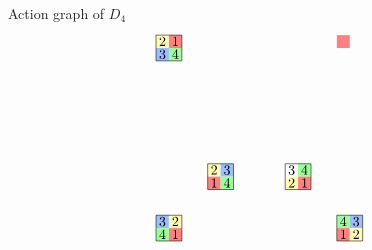 \documentclass[8pt, handout]{beamer}
\begin{document}
\begin{frame}{Action graph of $D_4$}
\[\begin{tikzpicture}
\begin{scope}[scale=.65]
\begin{scope}[shift={(3,-3)}]
        \path[fill=actGreen] (.5,.5) rectangle ++(.5,.5);
        \path[fill=actYellow] (0,0) rectangle ++(.5,.5);
        \path[fill=actRed] (.5,0) rectangle ++(.5,.5);
        \draw (0,0) rectangle (1,1);
        \draw (.25,.75) node{$3$}; \draw (.75,.75) node{$4$};
        \draw (.25,.25) node{$2$}; \draw (.75,.25) node{$1$};
      \end{scope}
      \begin{scope}[shift={(0,-3)}]
        \path[fill=actYellow] (0,.5) rectangle ++(.5,.5); 
        \path[fill=actBlue] (.5,.5) rectangle ++(.5,.5);
        \path[fill=actRed] (0,0) rectangle ++(.5,.5);
        \path[fill=actGreen] (.5,0) rectangle ++(.5,.5);
        \draw (0,0) rectangle (1,1);
        \draw (.25,.75) node{$2$}; \draw (.75,.75) node{$3$};
        \draw (.25,.25) node{$1$}; \draw (.75,.25) node{$4$};
      \end{scope}
      \begin{scope}[shift={(-2,2)}]
        \path[fill=actYellow] (0,.5) rectangle ++(.5,.5); 
        \path[fill=actRed] (.5,.5) rectangle ++(.5,.5);
        \path[fill=actBlue] (0,0) rectangle ++(.5,.5);
        \path[fill=actGreen] (.5,0) rectangle ++(.5,.5);
        \draw (0,0) rectangle (1,1);
        \draw (.25,.75) node{$2$}; \draw (.75,.75) node{$1$};
        \draw (.25,.25) node{$3$}; \draw (.75,.25) node{$4$};
      \end{scope}
      \begin{scope}[shift={(-2,-5)}]
        \path[fill=actBlue] (0,.5) rectangle ++(.5,.5); 
        \path[fill=actYellow] (.5,.5) rectangle ++(.5,.5);
        \path[fill=actGreen] (0,0) rectangle ++(.5,.5);
        \path[fill=actRed] (.5,0) rectangle ++(.5,.5);
        \draw (0,0) rectangle (1,1);
        \draw (.25,.75) node{$3$}; \draw (.75,.75) node{$2$};
        \draw (.25,.25) node{$4$}; \draw (.75,.25) node{$1$};
      \end{scope}
      \begin{scope}[shift={(5,-5)}]
        \path[fill=actGreen] (0,.5) rectangle ++(.5,.5); 
        \path[fill=actBlue] (.5,.5) rectangle ++(.5,.5);
        \path[fill=actRed] (0,0) rectangle ++(.5,.5);
        \path[fill=actYellow] (.5,0) rectangle ++(.5,.5);
        \draw (0,0) rectangle (1,1);
        \draw (.25,.75) node{$4$}; \draw (.75,.75) node{$3$};
        \draw (.25,.25) node{$1$}; \draw (.75,.25) node{$2$};
      \end{scope}
      \begin{scope}[shift={(5,2)}]
        \path[fill=actRed] (0,.5) rectangle ++(.5,.5); 

\end{scope}
\end{scope}
\end{tikzpicture}\]
\end{frame}
\end{document}
